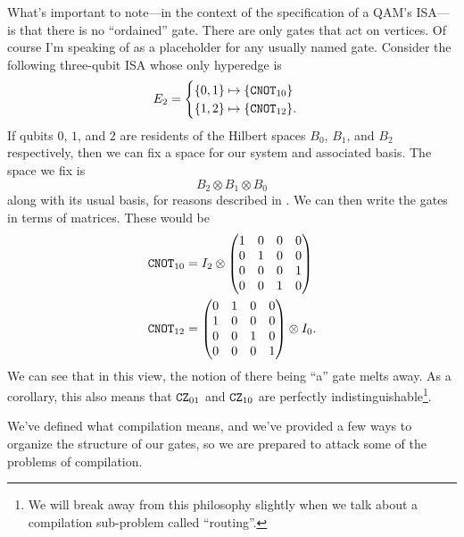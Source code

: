 What's important to note---in the context of the specification of a QAM's ISA---is that there is no ``ordained'' \CNOT{} gate. There are only \CNOT{} gates that act on vertices. Of course I'm speaking of \CNOT{} as a placeholder for any usually named gate. Consider the following three-qubit ISA whose only hyperedge is
\begin{displaymath}
E_2 = 
\begin{cases}
    \{0,1\} \mapsto \{\mathtt{CNOT}_{10}\}\\
    \{1,2\} \mapsto \{\mathtt{CNOT}_{12}\}.\\
\end{cases}
\end{displaymath}
If qubits $0$, $1$, and $2$ are residents of the Hilbert spaces $B_0$, $B_1$, and $B_2$ respectively, then we can fix a space for our system and associated basis. The space we fix is \[B_2\otimes B_1\otimes B_0\] along with its usual basis, for reasons described in \cite{shouts}. We can then write the gates in terms of matrices. These would be
\begin{align*}
    \mathtt{CNOT}_{10} &= I_2 \otimes
        \begin{pmatrix}
          1 & 0 & 0 & 0\\
          0 & 1 & 0 & 0\\
          0 & 0 & 0 & 1\\
          0 & 0 & 1 & 0
        \end{pmatrix}\\
    \mathtt{CNOT}_{12} &=
        \begin{pmatrix}
          0 & 1 & 0 & 0\\
          1 & 0 & 0 & 0\\
          0 & 0 & 1 & 0\\
          0 & 0 & 0 & 1
        \end{pmatrix}
        \otimes I_0.
\end{align*}
We can see that in this view, the notion of there being ``a'' \CNOT{} gate melts away. As a corollary, this also means that $\mathtt{CZ}_{01}$ and $\mathtt{CZ}_{10}$ are perfectly indistinguishable\footnote{We will break away from this philosophy slightly when we talk about a compilation sub-problem called ``routing''.}.

We've defined what compilation means, and we've provided a few ways to organize the structure of our gates, so we are prepared to attack some of the problems of compilation.